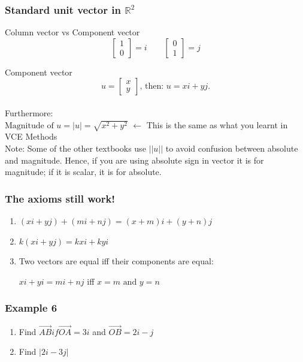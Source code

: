 \documentclass[
	11pt, %
]{beamer}
\begin{document}
\begin{frame}
    \frametitle{Standard unit vector in $\mathbb{R}^2$}
    \begin{block}{Column vector vs Component vector}
        \[
            \begin{bmatrix}
                1\\0
            \end{bmatrix} = i
            \qquad \begin{bmatrix}
                0\\1
            \end{bmatrix} = j
        \]
    \end{block}
    \begin{block}{Component vector}
        \[
        u = \begin{bmatrix}
            x\\y
        \end{bmatrix} \text{, then: }u = xi + yj.
        \]\\
        Furthermore:\\
        $\text{Magnitude of }u = |u| = \sqrt{x^2 + y^2}$ $\leftarrow$ This is the same as what you learnt in VCE Methods\\
        Note: Some of the other textbooks use $||u||$ to avoid confusion between absolute and magnitude. Hence, if you are using absolute sign in vector 
        it is for magnitude; if it is scalar, it is for absolute.
    \end{block}
\end{frame}

\begin{frame}
    \frametitle{The axioms still work!}
    \begin{enumerate}
        \item $(xi + yj) + (mi + nj) = (x + m)i + (y + n)j$
        \item $k(xi + yj) = kxi + kyi$
        \item Two vectors are equal iff their components are equal:\\
        \begin{center}
            $xi + yi = mi + nj$ iff $x = m \text{ and } y = n$
        \end{center}
    \end{enumerate}
\end{frame}

\begin{frame}[t]
    \frametitle{Example 6}
    \begin{enumerate}
        \item Find $\vec{AB} if \vec{OA} = 3i$ and $\vec{OB} = 2i - j$
        \item Find $|2i - 3j|$
    \end{enumerate}
\end{frame}
\end{document}
